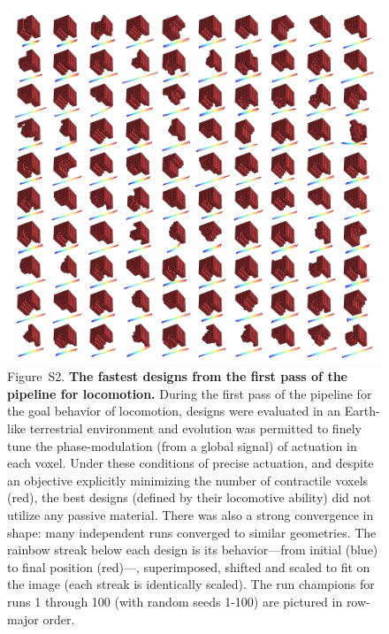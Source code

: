 \begin{figure}[t]
\centering
\includegraphics[width=\linewidth]{Chapter07/img/unconstrained_run_champs.png}
\caption*{Figure~S2.  \textbf{The fastest designs from the first pass of the pipeline for locomotion.} 
During the first pass of the pipeline for the goal behavior of locomotion, designs were evaluated in an Earth-like terrestrial environment and evolution was permitted to finely tune the phase-modulation (from a global signal) of actuation in each voxel. 
Under these conditions of precise actuation, and despite an objective explicitly minimizing the number of contractile voxels (red), the best designs (defined by their locomotive ability) did not utilize any passive material. 
There was also a strong convergence in shape: many independent runs converged to similar geometries. 
The rainbow streak below each design is its behavior---from initial (blue) to final position (red)---, superimposed, shifted and scaled to fit on the image (each streak is identically scaled). 
The run champions for runs 1 through 100 (with random seeds 1-100) are pictured in row-major order.
}
\end{figure}


